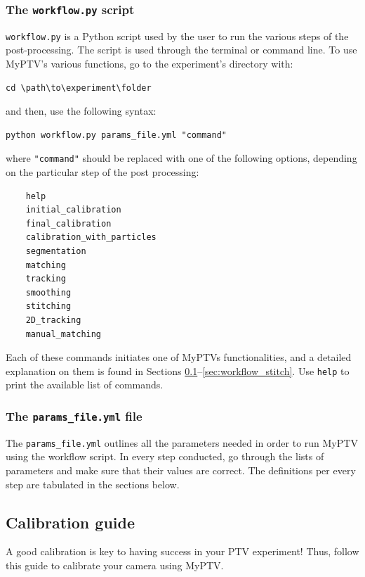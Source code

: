 \documentclass[10pt,a4paper]{article}
\begin{document}
\subsubsection{The \texttt{workflow.py} script} \label{sec:workflow_commands}

\texttt{workflow.py} is a Python script used by the user to run the various steps of the post-processing. The script is used through the terminal or command line. To use MyPTV's various functions, go to the experiment's directory with:
\begin{verbatim}
cd \path\to\experiment\folder
\end{verbatim}
%
and then, use the following syntax:
%
\begin{verbatim}
python workflow.py params_file.yml "command"
\end{verbatim}
%
where \texttt{"command"} should be replaced with one of the following options, depending on the particular step of the post processing:
%
\begin{verbatim}
	help
	initial_calibration
	final_calibration
	calibration_with_particles
	segmentation
	matching
	tracking	
	smoothing
	stitching
	2D_tracking
	manual_matching
\end{verbatim}
%
Each of these commands initiates one of MyPTVs functionalities, and a detailed explanation on them is found in Sections \ref{sec:cal_guide}--\ref{sec:workflow_stitch}. Use \texttt{help} to print the available list of commands.


\subsubsection{The \texttt{params\_file.yml} file}

The \texttt{params\_file.yml} outlines all the parameters needed in order to run MyPTV using the workflow script. In every step conducted, go through the lists of parameters and make sure that their values are correct. The definitions per every step are tabulated in the sections below.







\subsection{Calibration guide} \label{sec:cal_guide}


A good calibration is key to having success in your PTV experiment! Thus, follow this guide to calibrate your camera using MyPTV. 
\end{document}
